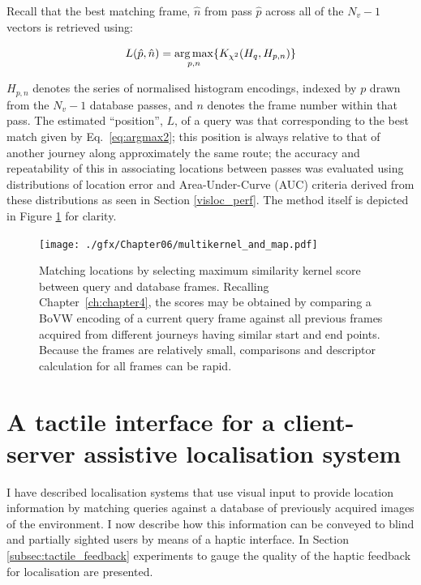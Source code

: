 Recall that the best matching frame, $\hat{n}$ from pass $\hat{p}$ across all of the $N_v-1$ vectors is retrieved using: 

\begin{equation}
\centering
L(\hat{p},\hat{n}) = \underset{p,n}{\arg \max} \lbrace K_{\chi^2}(H_q,H_{p,n})\rbrace
\label{eq:argmax2}
\end{equation}


$H_{p,n}$ denotes the series of normalised histogram encodings, indexed by $p$ drawn from the $N_v-1$ database passes, and $n$ denotes the frame number within that pass.  The estimated ``position'', $L$, of a query was that corresponding to the best match given by Eq.~\ref{eq:argmax2}; this position is always relative to that of another journey along approximately the same route; the accuracy and repeatability of this in associating locations between passes was evaluated using distributions of location error and Area-Under-Curve (AUC) criteria derived from these distributions as seen in Section \ref{visloc_perf}. The method itself is depicted in Figure \ref{fig:matching_from_kernels} for clarity.

\begin{figure}
\centering
\texttt{[image: ./gfx/Chapter06/multikernel\_and\_map.pdf]}
\caption{Matching locations by selecting maximum similarity kernel score between query and database frames. Recalling Chapter~\ref{ch:chapter4}, the scores may be obtained by comparing a BoVW encoding of a current query frame against all previous frames acquired from different journeys having similar start and end points. Because the frames are relatively small, comparisons and descriptor calculation for all frames can be rapid.}
\label{fig:matching_from_kernels}
\end{figure}


\section{A tactile interface for a client-server assistive localisation system}
\label{sec:tactile}
I have described localisation systems that use visual input to provide location information by matching queries against a da\-ta\-ba\-se of previously acquired images of the environment. I now describe how this information can be conveyed to blind and partially sighted users by means of a haptic interface. In Section \ref{subsec:tactile_feedback} experiments to gauge the quality of the haptic feedback for localisation are presented.

